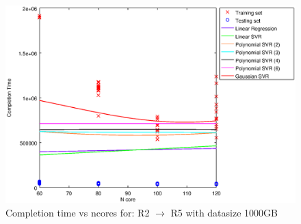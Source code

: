 
\begin {figure}[hbtp]
\centering
\includegraphics[width=\textwidth]{output/R2_R5_1000_ALL_FEATURES/plot_R2_R5_1000.eps}
\caption{Completion time vs ncores for: R2 $\rightarrow$ R5 with datasize 1000GB}
\label{fig:coreonly_linear_R2_R5_1000}
\end {figure}
